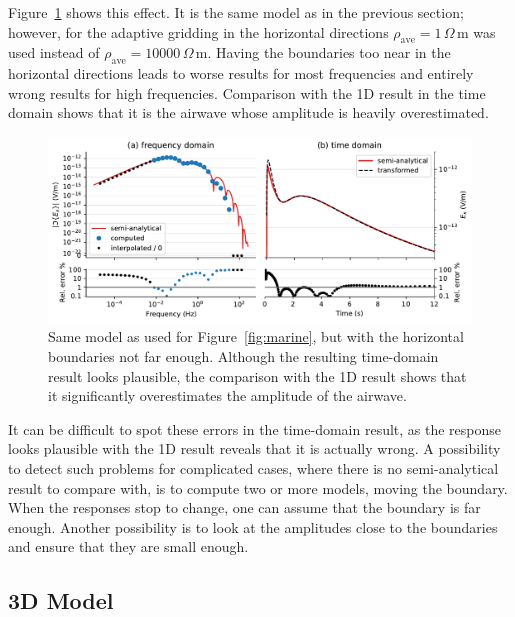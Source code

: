 \documentclass[extra, camera,%
    final,       %
]{gji}
\newlength{\fwidth}
\newcommand{\mr}[1]{\mathrm{#1}}
\newcommand{\ohmm}{\ensuremath{\Omega\,}\text{m}\xspace}
\begin{document}
Figure~\ref{fig:marine-wrong-x-y} shows this effect. It is the same model as in
the previous section; however, for the adaptive gridding in the horizontal
directions\added{,} $\rho_\mr{ave}=1\,\ohmm$ was used instead of
$\rho_\mr{ave}=\num{10000}\,\ohmm$. Having the boundaries too near in the
horizontal directions leads to worse results for most frequencies and entirely
wrong results for high frequencies. Comparison with the 1D result in the time
domain shows that it is the airwave whose amplitude is heavily overestimated.
%
\begin{figure}
  \centering
  \includegraphics[width=\fwidth]{08-marine-wrong-x-y}
  \caption{Same model as used for Figure~\ref{fig:marine}, but with the
    horizontal boundaries not far enough. Although the resulting time-domain
    result looks plausible, the comparison with the 1D result shows that it
    significantly overestimates the amplitude of the airwave.}
  \label{fig:marine-wrong-x-y}
\end{figure}
%
It can be difficult to spot these errors in the time-domain result, as the
response looks plausible
with the 1D result reveals that it is actually wrong. A possibility to detect
such problems for complicated cases, where there is no semi-analytical result
to compare with, is to compute two or more models, moving the boundary. When
the responses stop to change, one can assume that the boundary is far enough.
Another possibility is to look at the amplitudes close to the boundaries and
ensure that they are small enough.


\subsection{3D Model} %
\end{document}
